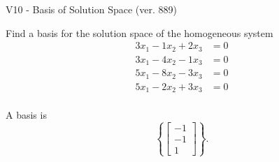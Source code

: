 \begin{exercise}
  \begin{exerciseTitle}V10 - Basis of Solution Space (ver. 889)\end{exerciseTitle}
  \begin{exerciseStatement}
    Find a basis for the solution space of the homogeneous system 
\begin{align*}
 3 x_ 1 -1 x_ 2 + 2 x_ 3 &= 0  \\ 
  3 x_ 1 -4 x_ 2 -1 x_ 3 &= 0  \\ 
  5 x_ 1 -8 x_ 2 -3 x_ 3 &= 0  \\ 
  5 x_ 1 -2 x_ 2 + 3 x_ 3 &= 0  \\ 
 \end{align*}


 
  \end{exerciseStatement}

  \begin{exerciseAnswer}
   A basis is   
\[\left\{\left[\begin{array}{c}
-1 \\
-1 \\
1
\end{array}\right]\right\}.\]

  


  \end{exerciseAnswer}
\end{exercise}